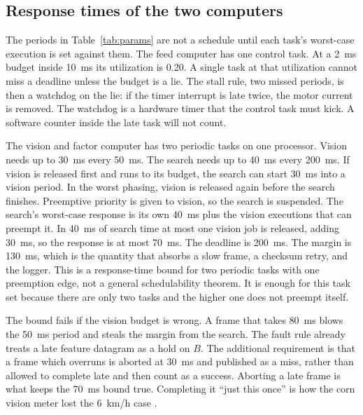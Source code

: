 \subsection{Response times of the two computers}

The periods in Table~\ref{tab:params} are not a schedule until each task's worst-case execution is set against them. The feed computer has one control task. At a 2~ms budget inside 10~ms its utilization is 0.20. A single task at that utilization cannot miss a deadline unless the budget is a lie. The stall rule, two missed periods, is then a watchdog on the lie: if the timer interrupt is late twice, the motor current is removed. The watchdog is a hardware timer that the control task must kick. A software counter inside the late task will not count.

The vision and factor computer has two periodic tasks on one processor. Vision needs up to 30~ms every 50~ms. The search needs up to 40~ms every 200~ms. If vision is released first and runs to its budget, the search can start 30~ms into a vision period. In the worst phasing, vision is released again before the search finishes. Preemptive priority is given to vision, so the search is suspended. The search's worst-case response is its own 40~ms plus the vision executions that can preempt it. In 40~ms of search time at most one vision job is released, adding 30~ms, so the response is at most 70~ms. The deadline is 200~ms. The margin is 130~ms, which is the quantity that absorbs a slow frame, a checksum retry, and the logger. This is a response-time bound for two periodic tasks with one preemption edge, not a general schedulability theorem. It is enough for this task set because there are only two tasks and the higher one does not preempt itself.

The bound fails if the vision budget is wrong. A frame that takes 80~ms blows the 50~ms period and steals the margin from the search. The fault rule already treats a late feature datagram as a hold on $B$. The additional requirement is that a frame which overruns is aborted at 30~ms and published as a miss, rather than allowed to complete late and then count as a success. Aborting a late frame is what keeps the 70~ms bound true. Completing it ``just this once'' is how the corn vision meter lost the 6~km/h case \cite{borja2021}.

